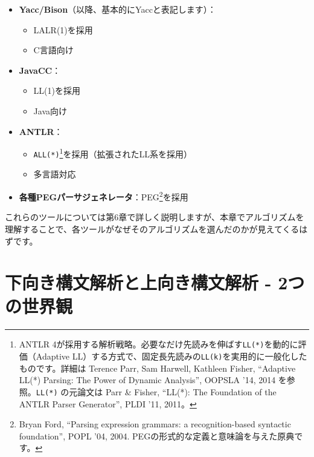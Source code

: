 \begin{itemize}
\tightlist
\item
  \textbf{Yacc/Bison}（以降、基本的にYaccと表記します）：

  \begin{itemize}
  \tightlist
  \item
    LALR(1)を採用
  \item
    C言語向け
  \end{itemize}
\item
  \textbf{JavaCC}：

  \begin{itemize}
  \tightlist
  \item
    LL(1)を採用
  \item
    Java向け
  \end{itemize}
\item
  \textbf{ANTLR}：

  \begin{itemize}
  \tightlist
  \item
    \texttt{ALL(*)}\footnote{ANTLR
      4が採用する解析戦略。必要なだけ先読みを伸ばす\texttt{LL(*)}を動的に評価（Adaptive
      LL）する方式で、固定長先読みの\texttt{LL(k)}を実用的に一般化したものです。詳細は
      Terence Parr, Sam Harwell, Kathleen Fisher, ``Adaptive LL(*)
      Parsing: The Power of Dynamic Analysis'', OOPSLA '14, 2014
      を参照。\texttt{LL(*)} の元論文は Parr \& Fisher, ``LL(*): The
      Foundation of the ANTLR Parser Generator'', PLDI '11, 2011。}を採用（拡張されたLL系を採用）
  \item
    多言語対応
  \end{itemize}
\item
  \textbf{各種PEGパーサジェネレータ}：PEG\footnote{Bryan Ford, ``Parsing
    expression grammars: a recognition-based syntactic foundation'',
    POPL '04, 2004. PEGの形式的な定義と意味論を与えた原典です。}を採用
\end{itemize}

これらのツールについては第6章で詳しく説明しますが、本章でアルゴリズムを理解することで、各ツールがなぜそのアルゴリズムを選んだのかが見えてくるはずです。

\hypertarget{chapter5-ux4e0bux5411ux304dux69cbux6587ux89e3ux6790ux3068ux4e0aux5411ux304dux69cbux6587ux89e3ux6790---2ux3064ux306eux4e16ux754cux89b3}{%
\section{下向き構文解析と上向き構文解析 -
2つの世界観}\label{chapter5-ux4e0bux5411ux304dux69cbux6587ux89e3ux6790ux3068ux4e0aux5411ux304dux69cbux6587ux89e3ux6790---2ux3064ux306eux4e16ux754cux89b3}}

